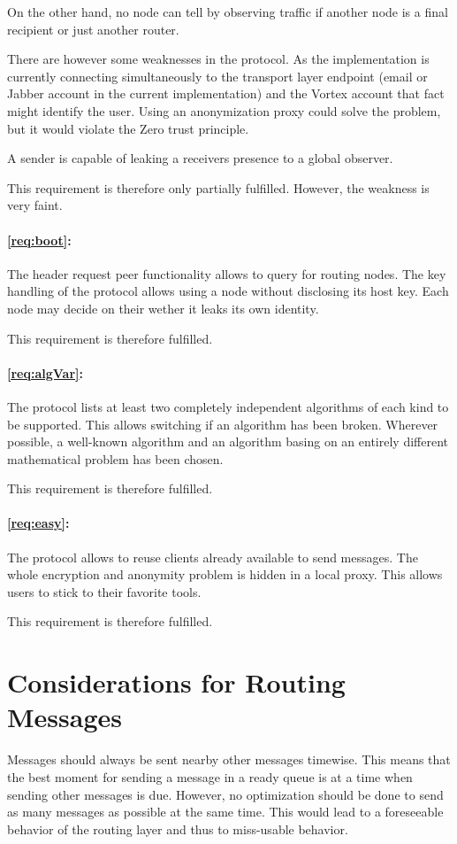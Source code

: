 On the other hand, no node can tell by observing traffic if another node is a final recipient or just another router.

There are however some weaknesses in the protocol. As the implementation is currently connecting simultaneously to the transport layer endpoint (email or Jabber account in the current implementation) and the Vortex account that fact might identify the user. Using an anonymization proxy could solve the problem, but it would violate the Zero trust principle.

A sender is capable of leaking a receivers presence to a global observer.

This requirement is therefore only partially fulfilled. However, the weakness is very faint.

\paragraph*{\ref{req:boot}:} The header request peer functionality allows to query for routing nodes. The key handling of the protocol allows using a node without disclosing its host key. Each node may decide on their wether it leaks its own identity.

This requirement is therefore fulfilled.

\paragraph*{\ref{req:algVar}:} The protocol lists at least two completely independent algorithms of each kind to be supported. This allows switching if an algorithm has been broken. Wherever possible, a well-known algorithm and an algorithm basing on an entirely different mathematical problem has been chosen.

This requirement is therefore fulfilled.

\paragraph*{\ref{req:easy}:} The protocol allows to reuse clients already available to send messages. The whole encryption and anonymity problem is hidden in a local proxy. This allows users to stick to their favorite tools.

This requirement is therefore fulfilled.

\section{Considerations for Routing Messages}
Messages should always be sent nearby other messages timewise. This means that the best moment for sending a message in a ready queue is at a time when sending other messages is due. However, no optimization should be done to send as many messages as possible at the same time. This would lead to a foreseeable behavior of the routing layer and thus to miss-usable behavior.

